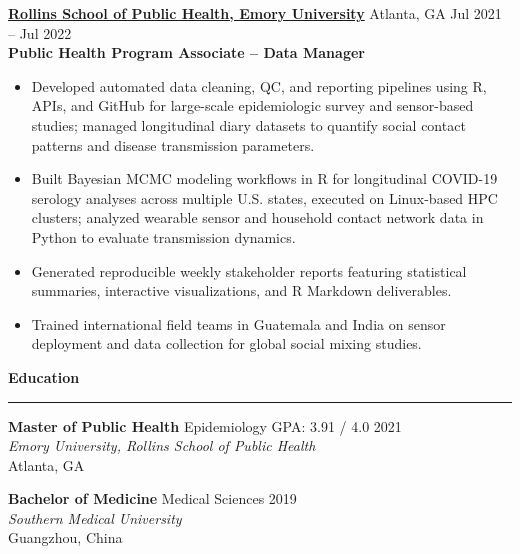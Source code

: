\documentclass[10pt]{article}
\begin{document}
\textbf{\underline{Rollins School of Public Health, Emory University}} \textbar \vspace{5pt} Atlanta, GA \hfill Jul 2021 -- Jul 2022 \\


\textbf{Public Health Program Associate – Data Manager} \\
\vspace{-1pt}
\begin{itemize}[leftmargin=*, topsep=2pt, itemsep=2pt]
  \item Developed automated data cleaning, QC, and reporting pipelines using R, APIs, and GitHub for large-scale epidemiologic survey and sensor-based studies; managed longitudinal diary datasets to quantify social contact patterns and disease transmission parameters.
  \item Built Bayesian MCMC modeling workflows in R for longitudinal COVID-19 serology analyses across multiple U.S. states, executed on Linux-based HPC clusters; analyzed wearable sensor and household contact network data in Python to evaluate transmission dynamics.
  \item Generated reproducible weekly stakeholder reports featuring statistical summaries, interactive visualizations, and R Markdown deliverables.
  \item Trained international field teams in Guatemala and India on sensor deployment and data collection for global social mixing studies.
\end{itemize}

\textbf{\textcolor{rBlue}{Education}}
\hrule

\textbf{Master of Public Health} \textbar \vspace{5pt} Epidemiology GPA: 3.91 / 4.0 \hfill 2021 \\ 
\vspace{-4pt}
\textit{Emory University, Rollins School of Public Health} \\
Atlanta,  GA 


\textbf{Bachelor of Medicine} \textbar \vspace{5pt} Medical Sciences \hfill 2019 \\
\vspace{-4pt}
\textit{Southern Medical University} \\
Guangzhou, China
\end{document}
